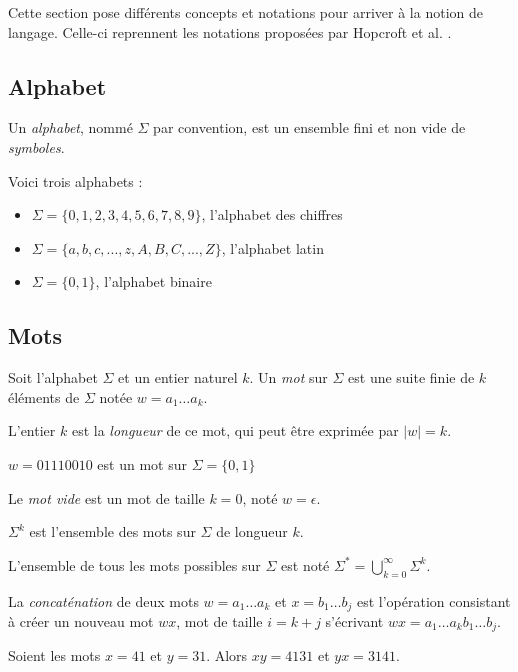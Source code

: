 Cette section pose différents concepts et notations pour arriver à la notion de langage. Celle-ci reprennent les notations proposées par Hopcroft et al. \cite{Hopcroft00}.


\subsection{Alphabet}

Un \emph{alphabet}, nommé $\Sigma$ par convention, est un ensemble fini et non vide de \emph{symboles}.

\begin{exemple} Voici trois alphabets : 
	\begin{itemize}
		\item $\Sigma = \{0,1,2,3,4,5,6,7,8,9\}$, l'alphabet des chiffres
		\item $\Sigma = \{a,b,c,...,z,A,B,C,...,Z\}$, l'alphabet latin
		\item $\Sigma = \{0,1\}$, l'alphabet binaire
	\end{itemize}
\end{exemple}


\subsection{Mots}

Soit l'alphabet $\Sigma$ et un entier naturel $k$. Un \emph{mot} sur $\Sigma$ est une suite finie de $k$ éléments de $\Sigma$ notée
$ w = a_1 \dots a_k $.

L'entier $k$ est la \emph{longueur} de ce mot, qui peut être exprimée par $|w|=k$.

\begin{exemple}
	$w=01110010$ est un mot sur $\Sigma=\{0,1\}$
\end{exemple}


Le \emph{mot vide} est un mot de taille $k=0$, noté $w=\epsilon$.

$\Sigma^k$ est l'ensemble des mots sur $\Sigma$ de longueur $k$.
	
L'ensemble de tous les mots possibles sur $\Sigma$ est noté $\Sigma^* = \bigcup_{k=0}^{\infty}\Sigma^k$.

La \emph{concaténation} de deux mots $w=a_1\dots a_k$ et $x=b_1\dots b_j$ est l'opération consistant à créer un nouveau mot $wx$, mot de taille $i=k+j$ s'écrivant $wx=a_1\dots a_kb_1\dots b_j$.

\begin{exemple}
	Soient les mots $x=41$ et $y=31$. Alors $xy=4131$ et $yx=3141$.
\end{exemple}

